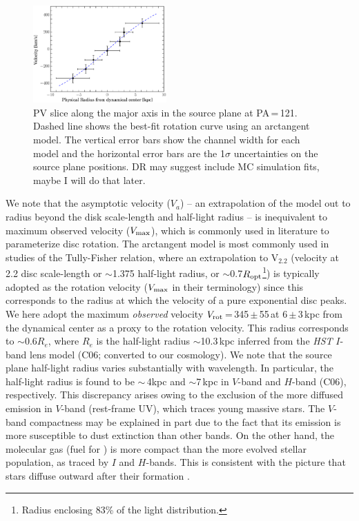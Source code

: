 \documentclass[]{emulateapj}
\begin{document}
\begin{figure}[!htbp]
\centering
\includegraphics[width=0.455\textwidth]{../Figures/bestfit_PV.eps}
\caption{PV slice along the major axis in the source plane at PA\,=\,121\degr.
Dashed line shows the best-fit rotation curve using an arctangent model.
The vertical error bars show the channel width for
each model and the horizontal error bars are the
1$\sigma$ uncertainties on the source plane positions.
DR may suggest include MC simulation fits, maybe I will do that later.
 \label{fig:PV}}
\end{figure}

We note that the asymptotic velocity ($V_{a}$) -- an extrapolation of the model
out to radius beyond the disk scale-length and half-light radius --
is inequivalent to maximum observed velocity ($V_{\rm max}$),
which is commonly used in literature to parameterize disc rotation.
The arctangent model is most commonly used in studies of the
Tully-Fisher relation, where an extrapolation to V$_{2.2}$ (velocity
at 2.2 disc scale-length or $\sim$1.375 half-light radius,
or $\sim$0.7$R_{\rm opt}$\footnote{Radius enclosing 83\% of the light
distribution.}) is typically adopted
as the rotation velocity ($V_{\rm max}$ in their
terminology) since this corresponds to the radius at which the velocity
of a pure exponential disc peaks.
We here adopt the maximum {\em observed} velocity
$V_{\rm rot}$\,=\,345\,$\pm$\,55\,\kms at 6\,$\pm$\,3\,kpc from the
dynamical center as a proxy to the rotation velocity.
This radius corresponds to $\sim$0.6$R_e$, where $R_e$ is the half-light
radius $\sim$10.3\,kpc inferred from the {\it HST} $I$-band
lens model (C06; converted to
our cosmology).
We note that the source plane half-light radius varies substantially with
wavelength. In particular, the half-light radius is found to be
$\sim$\,4kpc and $\sim$7\,kpc in $V$-band
\citep{Brewer08a} and $H$-band (C06), respectively.
This discrepancy arises owing to the exclusion of the more
diffused emission in $V$-band (rest-frame UV),
which traces young massive stars.
The $V$-band compactness may be explained in part
due to the fact that its emission is
more susceptible to dust extinction than other bands.
On the other hand, the molecular gas (fuel for \SF) is more compact
than the more evolved stellar population, as traced by $I$ and $H$-bands.
This is consistent with the picture that stars diffuse outward
after their formation \citep{Calzetti01a}.
\end{document}
